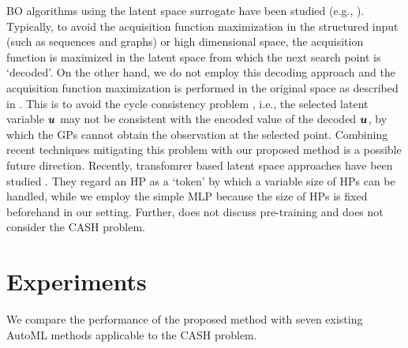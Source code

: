 

BO algorithms using the latent space surrogate have been studied (e.g., \cite{gomez2018automatic}). 
%
Typically, to avoid the acquisition function maximization in the structured input (such as sequences and graphs) or high dimensional space, the acquisition function is maximized in the latent space from which the next search point is `decoded'. 
%
On the other hand, we do not employ this decoding approach and the acquisition function maximization is performed in the original space as described in .
%
This is to avoid the cycle consistency problem \cite{jha2018disentangling}, i.e., the selected latent variable $\boldsymbol{u}$ may not be consistent with the encoded value of the decoded $\boldsymbol{u}$, by which the GPs cannot obtain the observation at the selected point.
%
Combining recent techniques mitigating this problem \cite{boyar2024latent} with our proposed method is a possible future direction.
%
Recently, transfomrer based latent space approaches have been studied \cite{lyu2023efficient,li2024an}.
%
They regard an HP as a `token' by which a variable size of HPs can be handled, while we employ the simple MLP because the size of HPs is fixed beforehand in our setting.
%
Further, \cite{li2024an} does not discuss pre-training and \cite{lyu2023efficient} does not consider the CASH problem. 





\section{Experiments}
\label{sec:experiments}

%
We compare the performance of the proposed method with seven existing AutoML methods applicable to the CASH problem.


